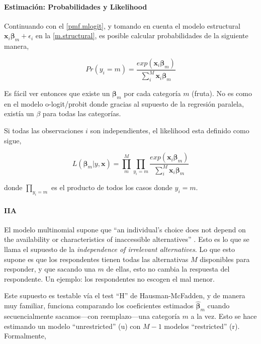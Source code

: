 \documentclass[onesided]{article}\usepackage[]{graphicx}\usepackage[]{color}
\begin{document}
\paragraph{Estimaci\'on: Probabilidades y Likelihood} Continuando con el \autoref{pmf.mlogit}, y tomando en cuenta el modelo estructural $\boldsymbol{x}_{i}\boldsymbol{\beta}_{m} + \epsilon_{i}$ en la \autoref{m.structural}, es posible calcular probabilidades de la siguiente manera,

\begin{equation}\label{prob.mlogit}
Pr(y_{i}=m) = \frac{exp(\boldsymbol{x}_{i}\boldsymbol{\beta}_{m})}{\sum_{i}^{M}\boldsymbol{x}_{i}\boldsymbol{\beta}_{m}}
\end{equation}

Es f\'acil ver entonces que existe un $\boldsymbol{\beta}_{m}$ por cada categor\'ia $m$ (fruta). No es como en el modelo o-logit/probit donde gracias al supuesto de la regresi\'on paralela, exist\'ia un $\beta$ para todas las categor\'ias. 

Si todas las observaciones $i$ son independientes, el likelihood esta definido como sigue,

\begin{equation}\label{ll.mlogit}
L(\boldsymbol{\beta}_{m} | y, \boldsymbol{x}) = \prod_{m}^{M} \prod_{y_{i}=m}\frac{exp(\boldsymbol{x}_{i}\boldsymbol{\beta}_{m})}{\sum_{i}^{M}\boldsymbol{x}_{i}\boldsymbol{\beta}_{m}}
\end{equation}

donde $\prod_{y_{i}=m}$ es el producto de todos los casos donde $y_{i}=m$. 


\paragraph{IIA} El modelo multinomial supone que ``an individual's choice does not depend on the availability or characteristics of inaccessible alternatives'' \parencite[166]{Ward2018}. Esto es lo que se llama el supuesto de la \emph{independence of irrelevant alternatives}. Lo que esto supone es que los respondentes tienen todas las alternativas $M$ disponibles para responder, y que sacando una $m$ de ellas, esto no cambia la respuesta del respondente. Un ejemplo: los respondentes no escogen el mal menor.

Este supuesto es testable v\'ia el test ``H'' de Hausman-McFadden, y de manera muy familiar, funciona comparando los coeficientes estimados $\boldsymbol{\hat\beta}_{m}$ cuando secuencialmente sacamos---con reemplazo---una categor\'ia $m$ a la vez. Esto se hace estimando un modelo ``unrestricted'' (u) con $M-1$ modelos ``restricted'' (r). Formalmente,
\end{document}
